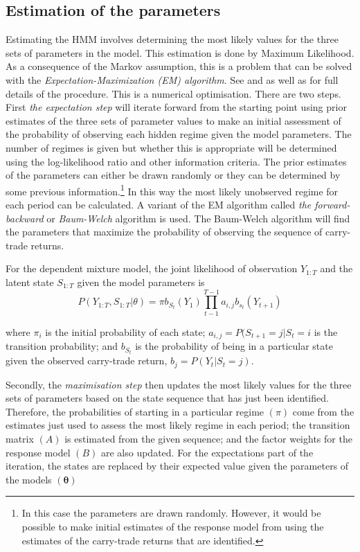 \documentclass[12pt, a4paper, oneside]{article}\usepackage[]{graphicx}\usepackage[]{color}
\begin{document}
\subsection{Estimation of the parameters}
Estimating the HMM involves determining the most likely values for the three sets of parameters in the model.  This estimation is done by Maximum Likelihood. As a consequence of the Markov assumption, this is a problem that can be solved with the \emph{Expectation-Maximization (EM) algorithm}.  See \citet{dempster1977maximum} and \citet{Hamilton1989} as well as \citet{depmixS4} for full details of the procedure.  This is a numerical optimisation.  There are two steps. First \emph{the expectation step} will iterate forward from the starting point using prior estimates of the three sets of parameter values  to make an initial assessment of the probability of observing each hidden regime given the model parameters.  The number of regimes is given but whether this is appropriate will be determined using the log-likelihood ratio and other information criteria.  The prior estimates of the parameters can either be drawn randomly or they can be determined by some previous information.\footnote{In this case the parameters are drawn randomly.  However, it would be possible to make initial estimates of the response model from \citet{Hayward2013} using the estimates of the carry-trade returns that are identified.}  In this way the most likely unobserved regime for each period can be calculated. A variant of the EM algorithm called \emph{the forward-backward} or \emph{Baum-Welch} algorithm \citet{Baum1970} is used.   The Baum-Welch algorithm will find the parameters that maximize the probability of observing the sequence of carry-trade returns.  

For the dependent mixture model, the joint likelihood of observation $Y_{1:T}$ and the latent state $S_{1:T}$ given the model parameters is 
\begin{equation}
P(Y_{1:T}, S_{1:T}|\theta) = \pi b_{S_t}(Y_1)\prod_{t-1}^{T-1} a_{i,j}b_{s_t}(Y_{t+1})
\end{equation}

where $\pi_i$ is the initial probability of each state; $a_{i,j} = P(S_{t+1} = j| S_t = i$ is the transition probability; and $b_{S_t}$ is the probability of being in a particular state given the observed carry-trade return, $b_j = P(Y_t|S_t = j)$.

Secondly, the \emph{maximisation step} then updates the most likely values for the three sets of parameters based on the state sequence that has just been identified. Therefore, the probabilities of starting in a particular regime $(\pi)$ come from the estimates just used to assess the most likely regime in each period; the transition matrix $(A)$ is estimated from the given sequence; and the factor weights for the response model $(B)$ are also updated. For the expectations part of the iteration, the states are replaced by their expected value given the parameters of the models $(\mathbf{\theta})$ 
\end{document}
